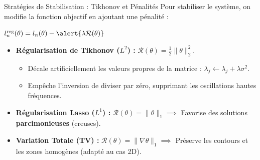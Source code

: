 \begin{frame}{Stratégies de Stabilisation : Tikhonov et Pénalités}
    Pour stabiliser le système, on modifie la fonction objectif en ajoutant une pénalité :
    
    \begin{center}
        \large $l_n^{\text{reg}}(\theta) = l_n(\theta) - \alert{\lambda \mathcal{R}(\theta)}$
    \end{center}
    
    \vspace{0.2cm}
    \begin{itemize}
        \item \textbf{Régularisation de Tikhonov ($L^2$) :} $\mathcal{R}(\theta) = \frac{1}{2}\|\theta\|^2_2$.
        \begin{itemize}
            \item Décale artificiellement les valeurs propres de la matrice : $\lambda_j \leftarrow \lambda_j + \lambda\sigma^2$.
            \item Empêche l'inversion de diviser par zéro, supprimant les oscillations hautes fréquences.
        \end{itemize}
        \item \textbf{Régularisation Lasso ($L^1$) :} $\mathcal{R}(\theta) = \|\theta\|_1 \implies$ Favorise des solutions \textbf{parcimonieuses} (creuses).
        \item \textbf{Variation Totale (TV) :} $\mathcal{R}(\theta) = \|\nabla \theta\|_1 \implies$ Préserve les contours et les zones homogènes (adapté au cas 2D).
    \end{itemize}
\end{frame}